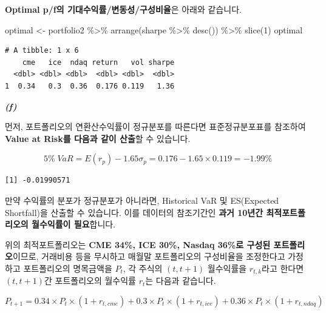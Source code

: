 \documentclass[
  letterpaper,
  DIV=11,
  numbers=noendperiod]{scrreprt}
\newenvironment{Shaded}{\begin{snugshade}}{\end{snugshade}}
\newcommand{\DecValTok}[1]{\textcolor[rgb]{0.68,0.00,0.00}{#1}}
\newcommand{\FloatTok}[1]{\textcolor[rgb]{0.68,0.00,0.00}{#1}}
\newcommand{\FunctionTok}[1]{\textcolor[rgb]{0.28,0.35,0.67}{#1}}
\newcommand{\NormalTok}[1]{\textcolor[rgb]{0.00,0.23,0.31}{#1}}
\newcommand{\OtherTok}[1]{\textcolor[rgb]{0.00,0.23,0.31}{#1}}
\newcommand{\SpecialCharTok}[1]{\textcolor[rgb]{0.37,0.37,0.37}{#1}}
\begin{document}
\textbf{Optimal p/f의 기대수익률/변동성/구성비율}은 아래와 같습니다.

\begin{Shaded}
\begin{Highlighting}[]
\NormalTok{optimal }\OtherTok{\textless{}{-}}\NormalTok{ portfolio2 }\SpecialCharTok{\%\textgreater{}\%} \FunctionTok{arrange}\NormalTok{(sharpe }\SpecialCharTok{\%\textgreater{}\%} \FunctionTok{desc}\NormalTok{()) }\SpecialCharTok{\%\textgreater{}\%} \FunctionTok{slice}\NormalTok{(}\DecValTok{1}\NormalTok{)}
\NormalTok{optimal}
\end{Highlighting}
\end{Shaded}

\begin{verbatim}
# A tibble: 1 x 6
    cme   ice  ndaq return   vol sharpe
  <dbl> <dbl> <dbl>  <dbl> <dbl>  <dbl>
1  0.34   0.3  0.36  0.176 0.119   1.36
\end{verbatim}

\textbf{\emph{(f)}}

먼저, 포트폴리오의 연환산수익률이 정규분포를 따른다면 표준정규분포표를
참조하여 \textbf{Value at Risk를 다음과 같이 산출}할 수 있습니다.

\[5\%\;VaR=E(r_p)-1.65\sigma_p=0.176-1.65\times 0.119=-1.99\%\]

\begin{Shaded}
\end{Shaded}

\begin{verbatim}
[1] -0.01990571
\end{verbatim}

만약 수익률의 분포가 정규분포가 아니라면, Historical VaR 및 ES(Expected
Shortfall)을 산출할 수 있습니다. 이를 데이터의 참조기간인 \textbf{과거
10년간 최적포트폴리오의 월수익률이 필요}합니다.

위의 최적포트폴리오는 \textbf{CME 34\%, ICE 30\%, Nasdaq 36\%로 구성된
포트폴리오}이므로, 거래비용 등을 무시하고 매월말 포트폴리오의 구성비율을
조정한다고 가정하고 포트폴리오의 명목금액을 \(P_t\), 각 주식의
\((t,t+1)\) 월수익률을 \(r_{t,k}\)라고 한다면 \((t,t+1)\)간 포트폴리오의
월수익률 \(r_t\)는 다음과 같습니다.

\[P_{t+1}=0.34\times P_t\times (1+r_{t,cme})+0.3\times P_t\times (1+r_{t,ice})+0.36\times P_t\times (1+r_{t,ndaq})\]
\end{document}
